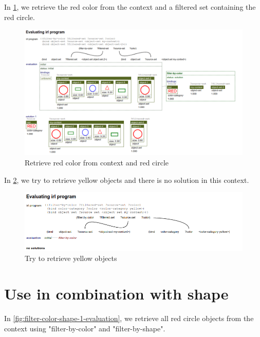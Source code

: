 \documentclass[a4paper,10pt]{article}
\begin{document}
In \ref{fig:filter-color-2-evaluation}, we retrieve the red color from the context and a filtered set containing the red circle.

\begin{figure}[!h]
    \centering
    \includegraphics[width=1.0\textwidth]{filter-color-2-evaluation.png}
    \caption{Retrieve red color from context and red circle}
    \label{fig:filter-color-2-evaluation}
\end{figure}

In \ref{fig:filter-color-3-evaluation}, we try to retrieve yellow objects and there is no solution in this context.

\begin{figure}[!h]
    \centering
    \includegraphics[width=1.0\textwidth]{filter-color-3-evaluation.png}
    \caption{Try to retrieve yellow objects}
    \label{fig:filter-color-3-evaluation}
\end{figure}

\section{Use in combination with shape}

In \ref{fig:filter-color-shape-1-evaluation}, we retrieve all red circle objects from the context using "filter-by-color" and "filter-by-shape".
\end{document}
